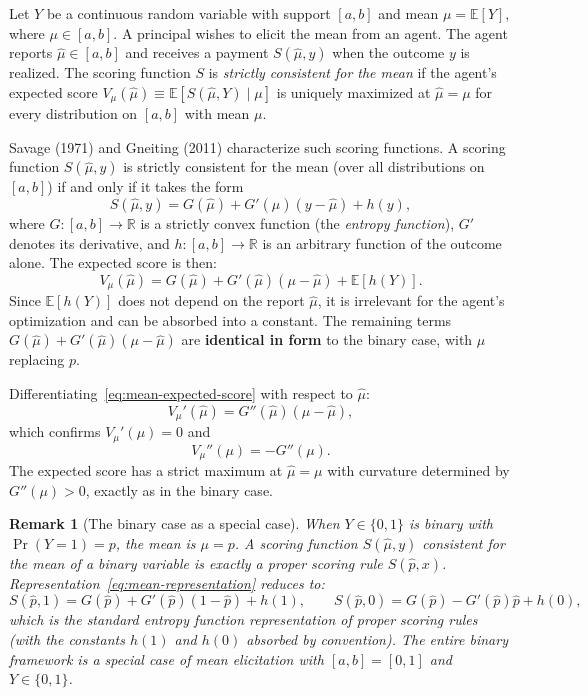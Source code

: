\documentclass[11pt]{article}
\newtheorem{remark}{Remark}
\begin{document}
Let $Y$ be a continuous random variable with support $[a,b]$ and mean $\mu = \mathbb{E}[Y]$, where $\mu \in [a,b]$. A principal wishes to elicit the mean from an agent. The agent reports $\hat{\mu} \in [a,b]$ and receives a payment $S(\hat{\mu}, y)$ when the outcome $y$ is realized. The scoring function $S$ is \emph{strictly consistent for the mean} if the agent's expected score $V_\mu(\hat{\mu}) \equiv \mathbb{E}[S(\hat{\mu}, Y) \mid \mu]$ is uniquely maximized at $\hat{\mu} = \mu$ for every distribution on $[a,b]$ with mean $\mu$.

Savage (1971) and Gneiting (2011) characterize such scoring functions. A scoring function $S(\hat{\mu}, y)$ is strictly consistent for the mean (over all distributions on $[a,b]$) if and only if it takes the form
\begin{equation}\label{eq:mean-representation}
S(\hat{\mu}, y) = G(\hat{\mu}) + G'(\hat{\mu})(y - \hat{\mu}) + h(y),
\end{equation}
where $G: [a,b] \to \mathbb{R}$ is a strictly convex function (the \emph{entropy function}), $G'$ denotes its derivative, and $h: [a,b] \to \mathbb{R}$ is an arbitrary function of the outcome alone. The expected score is then:
\begin{equation}\label{eq:mean-expected-score}
V_\mu(\hat{\mu}) = G(\hat{\mu}) + G'(\hat{\mu})(\mu - \hat{\mu}) + \mathbb{E}[h(Y)].
\end{equation}
Since $\mathbb{E}[h(Y)]$ does not depend on the report $\hat{\mu}$, it is irrelevant for the agent's optimization and can be absorbed into a constant. The remaining terms $G(\hat{\mu}) + G'(\hat{\mu})(\mu - \hat{\mu})$ are \textbf{identical in form} to the binary case, with $\mu$ replacing $p$.

Differentiating~\eqref{eq:mean-expected-score} with respect to $\hat{\mu}$:
\begin{equation}\label{eq:mean-Vprime}
V_\mu'(\hat{\mu}) = G''(\hat{\mu})(\mu - \hat{\mu}),
\end{equation}
which confirms $V_\mu'(\mu) = 0$ and
\begin{equation}\label{eq:mean-Vpp}
V_\mu''(\mu) = -G''(\mu).
\end{equation}
The expected score has a strict maximum at $\hat{\mu} = \mu$ with curvature determined by $G''(\mu) > 0$, exactly as in the binary case.

\begin{remark}[The binary case as a special case]\label{rem:binary-special}
When $Y \in \{0,1\}$ is binary with $\Pr(Y=1) = p$, the mean is $\mu = p$. A scoring function $S(\hat{\mu}, y)$ consistent for the mean of a binary variable is exactly a proper scoring rule $S(\hat{p}, x)$. Representation~\eqref{eq:mean-representation} reduces to:
\[
S(\hat{p}, 1) = G(\hat{p}) + G'(\hat{p})(1 - \hat{p}) + h(1), \qquad S(\hat{p}, 0) = G(\hat{p}) - G'(\hat{p})\hat{p} + h(0),
\]
which is the standard entropy function representation of proper scoring rules (with the constants $h(1)$ and $h(0)$ absorbed by convention). The entire binary framework is a special case of mean elicitation with $[a,b] = [0,1]$ and $Y \in \{0,1\}$.
\end{remark}
\end{document}
